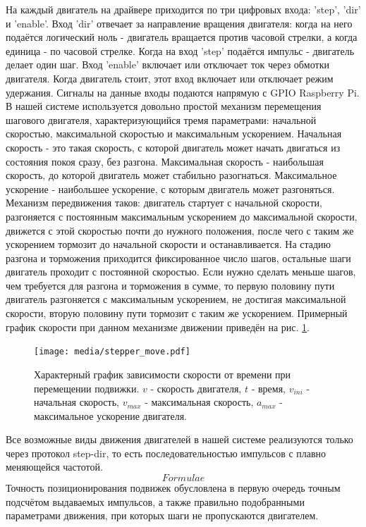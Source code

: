 \documentclass[14pt,russian,a4paper]{extarticle}
\begin{document}
На каждый двигатель на драйвере приходится по три цифровых входа: 'step', 'dir'  и 'enable'. Вход 'dir' отвечает за направление вращения двигателя: когда на него подаётся логический ноль - двигатель вращается против часовой стрелки, а когда единица - по часовой стрелке. Когда на вход 'step' подаётся импульс - двигатель делает один шаг. Вход 'enable' включает или отключает ток через обмотки двигателя. Когда двигатель стоит, этот вход включает или отключает режим удержания. Сигналы на данные входы подаются напрямую с GPIO Raspberry Pi.
\newline
В нашей системе используется довольно простой механизм перемещения шагового двигателя, характеризующийся тремя параметрами: начальной скоростью, максимальной скоростью и максимальным ускорением. Начальная скорость - это такая скорость, с которой двигатель может начать двигаться из состояния покоя сразу, без разгона. Максимальная скорость - наибольшая скорость, до которой двигатель может стабильно разогнаться. Максимальное ускорение - наибольшее ускорение, с которым двигатель может разгоняться. Механизм передвижения таков: двигатель стартует с начальной скорости, разгоняется с постоянным максимальным ускорением до максимальной скорости, движется с этой скоростью почти до нужного положения, после чего с таким же ускорением тормозит до начальной скорости и останавливается. На стадию разгона и торможения приходится фиксированное число шагов, остальные шаги двигатель проходит с постоянной скоростью. Если нужно сделать меньше шагов, чем требуется для разгона и торможения в сумме, то первую половину пути двигатель разгоняется с максимальным ускорением, не достигая максимальной скорости, вторую половину пути тормозит с таким же ускорением.
Примерный график скорости при данном механизме движении приведён на рис. \ref{fig:stepper_move}.

\begin{figure}[h!]
    \centerline{\texttt{[image: media/stepper\_move.pdf]}}
    \caption{Характерный график зависимости скорости от времени при перемещении подвижки. $v$ - скорость двигателя, $t$ - время, $v_{ini}$ - начальная скорость, $v_{max}$ - максимальная скорость, $a_{max}$ - максимальное ускорение двигателя.}
    \label{fig:stepper_move}
\end{figure}

Все возможные виды движения двигателей в нашей системе реализуются только через протокол step-dir, то есть последовательностью импульсов с плавно меняющейся частотой.
$$Formulae$$
Точность позиционирования подвижек обусловлена в первую очередь точным подсчётом выдаваемых импульсов, а также правильно подобранными параметрами движения, при которых шаги не пропускаются двигателем.
\end{document}
